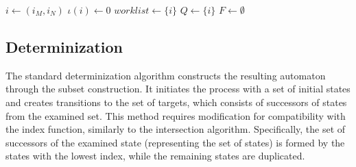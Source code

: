 \documentclass[pdflatex,sn-mathphys-num]{sn-jnl}%
\theoremstyle{thmstyleone}%
\theoremstyle{thmstyletwo}%
\theoremstyle{thmstylethree}%
\begin{document}
\begin{algorithm}
            $i \leftarrow (i_M, i_N)$\;
            $\iota(i) \leftarrow 0$\;
            $worklist \leftarrow \{i\}$\;
            $Q \leftarrow \{i\}$\;
            $F \leftarrow \emptyset$\;
            \;
            \normalsize
        \end{algorithm}

        \vspace*{-2em}

    \subsection{Determinization}
        The standard determinization algorithm constructs the resulting automaton through the subset construction. It initiates the process with a set of initial states and creates transitions to the set of targets, which consists of successors of states from the examined set. This method requires modification for compatibility with the index function, similarly to the intersection algorithm. Specifically, the set of successors of the examined state (representing the set of states) is formed by the states with the lowest index, while the remaining states are duplicated.

        \vspace*{-0.5em}
\end{document}
